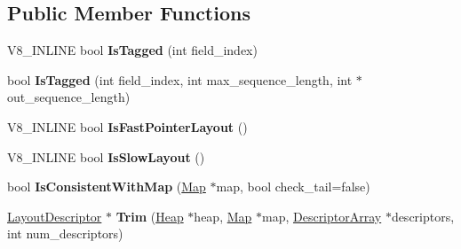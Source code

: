 \subsection*{Public Member Functions}
\begin{DoxyCompactItemize}
\item 
V8\+\_\+\+I\+N\+L\+I\+NE bool {\bfseries Is\+Tagged} (int field\+\_\+index)\hypertarget{classv8_1_1internal_1_1_layout_descriptor_aa4c100cd64137fcdecb7ad467f20a670}{}\label{classv8_1_1internal_1_1_layout_descriptor_aa4c100cd64137fcdecb7ad467f20a670}

\item 
bool {\bfseries Is\+Tagged} (int field\+\_\+index, int max\+\_\+sequence\+\_\+length, int $\ast$out\+\_\+sequence\+\_\+length)\hypertarget{classv8_1_1internal_1_1_layout_descriptor_a78d2cef08a6eac4780de265b824713de}{}\label{classv8_1_1internal_1_1_layout_descriptor_a78d2cef08a6eac4780de265b824713de}

\item 
V8\+\_\+\+I\+N\+L\+I\+NE bool {\bfseries Is\+Fast\+Pointer\+Layout} ()\hypertarget{classv8_1_1internal_1_1_layout_descriptor_afa7a6eea54f84f69478020f2b9fd0bac}{}\label{classv8_1_1internal_1_1_layout_descriptor_afa7a6eea54f84f69478020f2b9fd0bac}

\item 
V8\+\_\+\+I\+N\+L\+I\+NE bool {\bfseries Is\+Slow\+Layout} ()\hypertarget{classv8_1_1internal_1_1_layout_descriptor_ac09fdea7453451733f05cd8ee194faf7}{}\label{classv8_1_1internal_1_1_layout_descriptor_ac09fdea7453451733f05cd8ee194faf7}

\item 
bool {\bfseries Is\+Consistent\+With\+Map} (\hyperlink{classv8_1_1internal_1_1_map}{Map} $\ast$map, bool check\+\_\+tail=false)\hypertarget{classv8_1_1internal_1_1_layout_descriptor_aa8704292ac00a50547635263bc764b56}{}\label{classv8_1_1internal_1_1_layout_descriptor_aa8704292ac00a50547635263bc764b56}

\item 
\hyperlink{classv8_1_1internal_1_1_layout_descriptor}{Layout\+Descriptor} $\ast$ {\bfseries Trim} (\hyperlink{classv8_1_1internal_1_1_heap}{Heap} $\ast$heap, \hyperlink{classv8_1_1internal_1_1_map}{Map} $\ast$map, \hyperlink{classv8_1_1internal_1_1_descriptor_array}{Descriptor\+Array} $\ast$descriptors, int num\+\_\+descriptors)\hypertarget{classv8_1_1internal_1_1_layout_descriptor_a8508d71d4cbf2fa97c1d1c9140301329}{}\label{classv8_1_1internal_1_1_layout_descriptor_a8508d71d4cbf2fa97c1d1c9140301329}


\end{DoxyCompactItemize}
